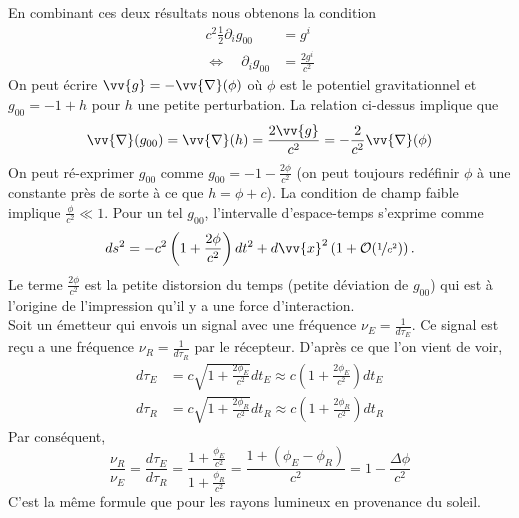 \documentclass[a4paper,11pt]{report}
\theoremstyle{definition}
\theoremstyle{plain}
\theoremstyle{definition}
\theoremstyle{remark}
\newcommand{\p}{\partial}
\begin{document}
            En combinant ces deux résultats nous obtenons la condition
            \begin{align}
                c^2\frac{1}{2}\p_i g_{00} &= g^i \\
                \Leftrightarrow\quad \p_i g_{00} &= \frac{2g^i}{c^2} 
            \end{align}
            On peut écrire $\vv{g}=-\vv{\nabla}(\phi)$ où $\phi$ est le potentiel gravitationnel et $g_{00}=-1+h$ pour $h$ une petite perturbation. La relation ci-dessus implique que
            \begin{equation}
                \vv{\nabla}(g_{00}) = \vv{\nabla}(h) = \frac{2\vv{g}}{c^2} = -\frac{2}{c^2}\vv{\nabla}(\phi)
            \end{equation}
            On peut ré-exprimer $g_{00}$ comme $g_{00} = -1-\frac{2\phi}{c^2}$ (on peut toujours redéfinir $\phi$ à une constante près de sorte à ce que $h = \phi+c$). La condition de champ faible implique $\frac{\phi}{c^2}\ll 1$. Pour un tel $g_{00}$, l'intervalle d'espace-temps s'exprime comme
            \begin{equation}
                ds^2 = -c^2\left( 1+\frac{2\phi}{c^2} \right)dt^2 + d\vv{x}^2\left( 1+\order{\nicefrac{1}{c^2}} \right).
            \end{equation}
            Le terme $\frac{2\phi}{c^2}$ est la petite distorsion du temps (petite déviation de $g_{00}$) qui est à l'origine de l'impression qu'il y a une force d'interaction.\\
            
            Soit un émetteur qui envois un signal avec une fréquence $\nu_E = \frac{1}{d\tau_E}$. Ce signal est reçu a une fréquence $\nu_R = \frac{1}{d\tau_R}$ par le récepteur. D'après ce que l'on vient de voir,
            \begin{align}
                d\tau_E &= c\sqrt{1+\frac{2\phi_E}{c^2}}dt_E \approx c\left( 1+\frac{2\phi_E}{c^2} \right) dt_E\\
                d\tau_R &= c\sqrt{1+\frac{2\phi_R}{c^2}}dt_R \approx c\left( 1+\frac{2\phi_R}{c^2} \right) dt_R
            \end{align}
            Par conséquent,
            \begin{equation}
                \frac{\nu_R}{\nu_E} = \frac{d\tau_E}{d\tau_R} = \frac{1+\frac{\phi_E}{c^2}}{1+\frac{\phi_R}{c^2}} = \frac{1+ (\phi_E-\phi_R)}{c^2} = 1-\frac{\Delta \phi}{c^2}
            \end{equation}
            C'est la même formule que pour les rayons lumineux en provenance du soleil.
\end{document}
